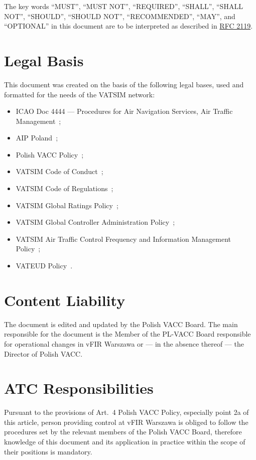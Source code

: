 The key words ``MUST'', ``MUST NOT'', ``REQUIRED'', ``SHALL'', ``SHALL
      NOT'', ``SHOULD'', ``SHOULD NOT'', ``RECOMMENDED'',  ``MAY'', and
      ``OPTIONAL'' in this document are to be interpreted as described in
      \href{https://www.rfc-editor.org/rfc/rfc2119}{RFC 2119}.

\section{Legal Basis}
This document was created on the basis of the following legal bases, used and formatted for the needs of the VATSIM network:
\begin{itemize}
    \item ICAO Doc 4444 --- Procedures for Air Navigation Services, Air Traffic Management~\cite{4444};
    \item AIP Poland~\cite{aip};
    \item Polish VACC Policy~\cite{policy};
    \item VATSIM Code of Conduct~\cite{coc};
    \item VATSIM Code of Regulations~\cite{cor};
    \item VATSIM Global Ratings Policy~\cite{grp};
    \item VATSIM Global Controller Administration Policy~\cite{gcap};
    \item VATSIM Air Traffic Control Frequency and Information Management Policy~\cite{atis};
    \item VATEUD Policy~\cite{vateud}.
\end{itemize}

\section{Content Liability}
The document is edited and updated by the Polish VACC Board. The main responsible for the document is the Member of the PL-VACC Board responsible for operational changes in vFIR Warszawa or --- in the absence thereof --- the Director of Polish VACC\@.

\section{ATC Responsibilities}
Pursuant to the provisions of Art.\ 4 Polish VACC Policy, especially point 2a of
this article, person providing control at vFIR Warszawa is obliged to follow the
procedures set by the relevant members of the Polish VACC Board, therefore
knowledge of this document and its application in practice within the scope of
their positions is mandatory.

